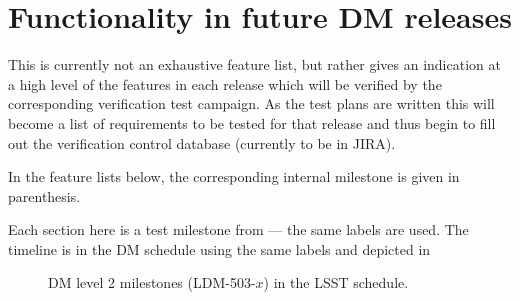 \section{Functionality in future DM releases}
\label{sect:features}

This is currently not an exhaustive feature list, but rather gives an indication at a high level of the features in each release which will be verified by the corresponding verification test campaign.
As the test plans are written this will become a list of requirements to be tested for that release and thus begin to fill out the verification control database (currently to be in JIRA).

In the feature lists below, the corresponding internal milestone is given in parenthesis.

Each section here is a test milestone from  --- the same labels are used.
The timeline is in the DM schedule using the same labels and depicted in 

\begin{figure}[htbp]
        \begin{center}
                 
                 \caption{DM level 2 milestones (LDM-503-$x$) in the LSST schedule.}
                 \label{fig:schedule}
         \end{center}
 \end{figure}


